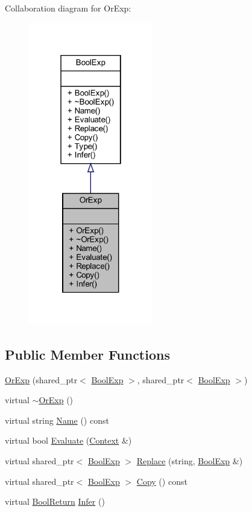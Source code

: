 Collaboration diagram for Or\+Exp\+:
\nopagebreak
\begin{figure}[H]
\begin{center}
\leavevmode
\includegraphics[width=154pt]{classOrExp__coll__graph}
\end{center}
\end{figure}
\subsection*{Public Member Functions}
\begin{DoxyCompactItemize}
\item 
\mbox{\hyperlink{classOrExp_a600a2b33932bd7e8ea4011180a9ae791}{Or\+Exp}} (shared\+\_\+ptr$<$ \mbox{\hyperlink{classBoolExp}{Bool\+Exp}} $>$, shared\+\_\+ptr$<$ \mbox{\hyperlink{classBoolExp}{Bool\+Exp}} $>$)
\item 
virtual \mbox{\hyperlink{classOrExp_a13e824ccc65f06421b506a3428d73ca5}{$\sim$\+Or\+Exp}} ()
\item 
virtual string \mbox{\hyperlink{classOrExp_a8e535ae2da801bf5a4e8c9fbf3426a8b}{Name}} () const
\item 
virtual bool \mbox{\hyperlink{classOrExp_a2056a325b87621e2a3d0afff79c4163e}{Evaluate}} (\mbox{\hyperlink{classContext}{Context}} \&)
\item 
virtual shared\+\_\+ptr$<$ \mbox{\hyperlink{classBoolExp}{Bool\+Exp}} $>$ \mbox{\hyperlink{classOrExp_a256171f2cf3d3165745d6df9390d9ab7}{Replace}} (string, \mbox{\hyperlink{classBoolExp}{Bool\+Exp}} \&)
\item 
virtual shared\+\_\+ptr$<$ \mbox{\hyperlink{classBoolExp}{Bool\+Exp}} $>$ \mbox{\hyperlink{classOrExp_a142f557d9b95c4464dbd9167dbb9fe51}{Copy}} () const
\item 
virtual \mbox{\hyperlink{structBoolReturn}{Bool\+Return}} \mbox{\hyperlink{classOrExp_aa3b98be68c00bc0c43a9eec5a47cdec9}{Infer}} ()
\end{DoxyCompactItemize}


